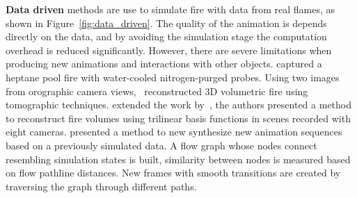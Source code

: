 \textbf{Data driven} methods are use to simulate fire with data from real flames, as shown in Figure~\ref{fig:data_driven}.
The quality of the animation is depends directly on the data, and by avoiding the simulation stage the computation overhead is reduced significantly.
However, there are severe limitations when producing new animations and interactions with other objects.
\cite{Rushmeier:1995} captured a heptane pool fire with water-cooled nitrogen-purged probes.
Using two images from orographic camera views,~\cite{Hasinoff:2003} reconstructed 3D volumetric fire using tomographic techniques.
\cite{Ihrke:2004} extended the work by~\cite{Hasinoff:2003}, the authors presented a method to reconstruct fire volumes using trilinear basis functions in scenes recorded with eight cameras.
\cite{Zhang:2011} presented a method to new synthesize new animation sequences based on a previously simulated data.
A flow graph whose nodes connect resembling simulation states is built, similarity between nodes is measured based on flow pathline distances.
New frames with smooth transitions are created by traversing the graph through different paths.


